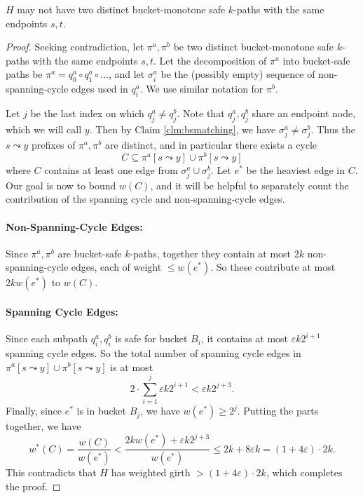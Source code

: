 \documentclass{theoretics}
\newcommand{\eps}{\varepsilon}
\begin{document}
\begin{lemma}  \label{lem:fulldisp}
$H$ may not have two distinct bucket-monotone safe $k$-paths with the same endpoints $s, t$.
\end{lemma}
\begin{proof}
Seeking contradiction, let $\pi^a, \pi^b$ be two distinct bucket-monotone safe $k$-paths with the same endpoints $s, t$.
Let the decomposition of $\pi^a$ into bucket-safe paths be
$\pi^a = q^a_0 \circ q^a_1 \circ \dots$, and let $\sigma^a_i$ be the (possibly empty) sequence of non-spanning-cycle edges used in $q^a_i$.
We use similar notation for $\pi^b$.

Let $j$ be the last index on which $q^a_j \ne q^b_j$.
Note that $q^a_{j}, q^b_{j}$ share an endpoint node, which we will call $y$.
Then by Claim \ref{clm:bsmatching}, we have $\sigma^a_{j} \ne \sigma^b_{j}$.
Thus the $s \leadsto y$ prefixes of $\pi^a, \pi^b$ are distinct, and in particular there exists a cycle
$$C \subseteq \pi^a[s \leadsto y] \cup \pi^b[s\leadsto y]$$
where $C$ contains at least one edge from $\sigma^a_{j} \cup \sigma^b_{j}$.
Let $e^*$ be the heaviest edge in $C$.
Our goal is now to bound $w(C)$, and it will be helpful to separately count the contribution of the spanning cycle and non-spanning-cycle edges.

\paragraph{Non-Spanning-Cycle Edges:} Since $\pi^a, \pi^b$ are bucket-safe $k$-paths, together they contain at most $2k$ non-spanning-cycle edges, each of weight $\le w(e^*)$.
So these contribute at most $2k w(e^*)$ to $w(C)$.

\paragraph{Spanning Cycle Edges:} Since each subpath $q^a_i, q^b_i$ is safe for bucket $B_i$, it contains at most $\eps k 2^{i+1}$ spanning cycle edges.
So the total number of spanning cycle edges in $\pi^a[s\leadsto y] \cup \pi^b[s\leadsto y]$ is at most
$$2 \cdot \sum \limits_{i=1}^j \eps k 2^{i+1} < \eps k 2^{j+3}.$$
Finally, since $e^*$ is in bucket $B_j$, we have $w(e^*) \ge 2^j$.
Putting the parts together, we have
$$w^*(C) = \frac{w(C)}{w(e^*)} < \frac{2k w(e^*) + \eps k 2^{j+3}}{w(e^*)} \le 2k + 8 \eps k = (1+4\eps) \cdot 2k.$$
This contradicts that $H$ has weighted girth $> (1+4\eps) \cdot 2k$, which completes the proof.
\end{proof}
\end{document}

